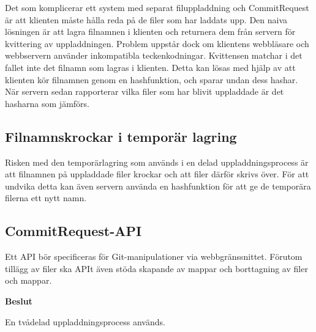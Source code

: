 Det som komplicerar ett system med separat filuppladdning och CommitRequest är att klienten måste hålla reda på de filer som har laddats upp. Den naiva lösningen är att lagra filnamnen i klienten och returnera dem från servern för kvittering av uppladdningen. Problem uppstår dock om klientens webbläsare och webbservern använder inkompatibla teckenkodningar. Kvittensen matchar i det fallet inte det filnamn som lagras i klienten. 
Detta kan lösas med hjälp av att klienten kör filnamnen genom en hashfunktion, och sparar undan dess hashar. När servern sedan rapporterar vilka filer som har blivit uppladdade är det hasharna som jämförs.

\subsection{Filnamnskrockar i temporär lagring}
Risken med den temporärlagring som används i en delad uppladdningsprocess är att filnamnen på uppladdade filer krockar och att filer därför skrivs över. För att undvika detta kan även servern använda en hashfunktion för att ge de temporära filerna ett nytt namn.

\subsection{CommitRequest-API}
Ett API bör specificeras för Git-manipulationer via webbgränssnittet. Förutom tillägg av filer ska APIt även stöda skapande av mappar och borttagning av filer och mappar.

\begin{flushright}
  
  \textbf{Beslut}
  
  En tvådelad uppladdningsprocess används.
  
\end{flushright}